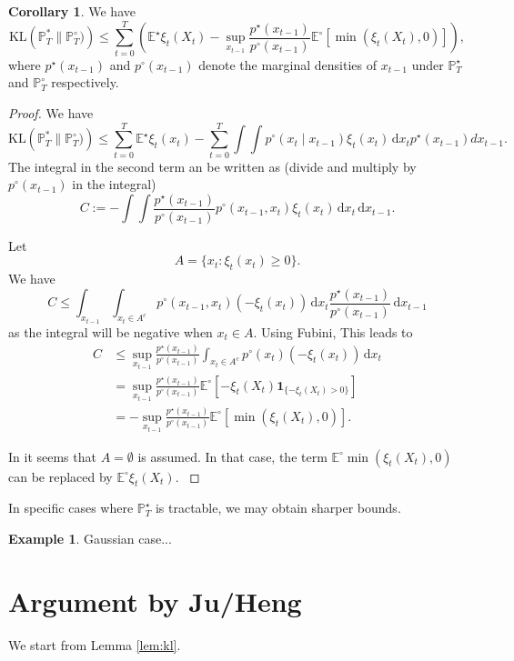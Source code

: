 \documentclass[11pt,reqno]{amsart}
\newcommand{\dd}{{\,\mathrm d}}
\newcommand{\EE}{\mathbb{E}}
\newcommand{\PP}{\mathbb{P}}
\newcommand{\ind}{\mathbf{1}}
\theoremstyle{definition}
\newtheorem{cor}[thm]{Corollary}
\newtheorem{ex}[thm]{Example}
\newcommand{\KL}[2]{\mathrm{KL}\left(#1 \| #2\right)}
\def \pcirc {p^\circ}
\newcommand{\note}[1]{{\color{Red} #1}}
\begin{document}
\begin{cor}
We have
\begin{equation}\label{eq:klbound}
	\KL{\mathbb{P}_T^*}{\mathbb{P}_T^\circ)} \le  \sum_{t = 0}^T \left(\EE^\star \xi_t(X_t)-\sup_{x_{t-1}}\frac{p^\star(x_{t-1})}{p^\circ(x_{t-1})}  \EE^\circ \left[\min(\xi_t(X_t),0) \right]  \right), 
\end{equation} 
where $p^\star(x_{t-1})$ and $p^\circ(x_{t-1})$ denote the marginal densities of $x_{t-1}$ under $\PP^\star_T$ and $\PP^\circ_T$ respectively.
\end{cor}
\begin{proof}
	We have
\[ \KL{\mathbb{P}_T^*}{\mathbb{P}_T^\circ)} \le \sum_{t = 0}^T \EE^\star \xi_t(x_t)  -  
\sum_{t = 0}^T\int \int  \pcirc(x_t \mid x_{t - 1}) \xi_t(x_t) \dd x_t p^\star(x_{t-1}) d x_{t-1}. \] 
The integral in the second term an be written as (divide and multiply by $p^\circ(x_{t-1})$ in the integral)
\[ C:=-	\int \int \frac{p^\star(x_{t-1})}{p^\circ(x_{t-1})} p^\circ(x_{t-1}, x_t) \xi_t(x_t) \dd x_t \dd x_{t-1}. \]


Let 
\[ A=\{x_t \colon \xi_t(x_t)\ge 0\}.\]
We have
\[ C \le \int_{x_{t-1}} \int_{x_t \in A^c} p^\circ(x_{t-1}, x_t) (-\xi_t(x_t)) \dd x_t \frac{p^\star(x_{t-1})}{p^\circ(x_{t-1})} \dd x_{t-1} \]
as the integral will be negative when $x_t \in A$. 
Using Fubini, This leads to
\begin{align*}
	C &\le \sup_{x_{t-1}}\frac{p^\star(x_{t-1})}{p^\circ(x_{t-1})} \int_{x_t \in A^c} p^\circ(x_t)  (-\xi_t(x_t)) \dd x_t\\ &=\sup_{x_{t-1}}\frac{p^\star(x_{t-1})}{p^\circ(x_{t-1})} \EE^\circ \left[-\xi_t(X_t) \ind_{\{-\xi_t(X_t)>0\}}\right]\\
	&= -\sup_{x_{t-1}}\frac{p^\star(x_{t-1})}{p^\circ(x_{t-1})}  \EE^\circ \left[\min(\xi_t(X_t),0) \right] . 
\end{align*} 

\note{In \cite{ju2021sequential} it seems that $A=\emptyset$ is assumed. In that case, the term $\EE^\circ \min(\xi_t(X_t),0)$ can be replaced by $\EE^\circ \xi_t(X_t)$. }

\end{proof}



In specific cases where $\PP^\star_T$ is tractable, we may obtain sharper bounds.
\begin{ex}
	Gaussian case...
\end{ex}


\section{Argument by Ju/Heng}
We start from Lemma \ref{lem:kl}.
\end{document}
